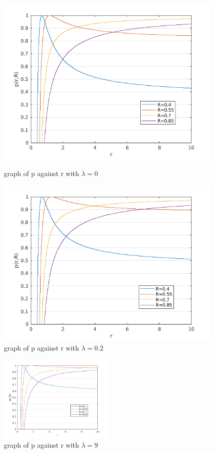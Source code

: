 \documentclass[10pt]{article}
\begin{document}
\begin{figure}[h]
    \begin{minipage}[b]{0.5\linewidth}
            \centering
            \includegraphics[width=\textwidth]{q2/q2_0.png}
            \caption{graph of p against r with $\lambda=0$}
        \end{minipage}
        \hfill
        \begin{minipage}[b]{0.5\linewidth}
            \centering
            \includegraphics[width=\textwidth]{q2/q2_2.png}
            \caption{graph of p against r with $\lambda=0.2$}
        \end{minipage}
\end{figure}
\newpage
\begin{figure}[h]
    \centering
    \includegraphics[width=0.5\textwidth]{q2/q2_9.png}
    \caption{graph of p against r with $\lambda=9$}
\end{figure}
\end{document}
